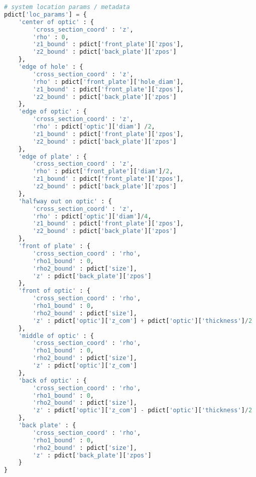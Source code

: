 \begin{spacing}{1.2}
\begin{lstlisting}[frame=single, language=Python]
# system location params / metadata
pdict['loc_params'] = {
    'center of optic' : {
        'cross_section_coord' : 'z',
        'rho' : 0,
        'z1_bound' : pdict['front_plate']['zpos'],
        'z2_bound' : pdict['back_plate']['zpos']
    },
    'edge of hole' : {
        'cross_section_coord' : 'z',
        'rho' : pdict['front_plate']['hole_diam'],
        'z1_bound' : pdict['front_plate']['zpos'],
        'z2_bound' : pdict['back_plate']['zpos']
    },
    'edge of optic' : {
        'cross_section_coord' : 'z',
        'rho' : pdict['optic']['diam'] /2,
        'z1_bound' : pdict['front_plate']['zpos'],
        'z2_bound' : pdict['back_plate']['zpos']
    },
    'edge of plate' : {
        'cross_section_coord' : 'z',
        'rho' : pdict['front_plate']['diam']/2,
        'z1_bound' : pdict['front_plate']['zpos'],
        'z2_bound' : pdict['back_plate']['zpos']
    },
    'halfway out on optic' : {
        'cross_section_coord' : 'z',
        'rho' : pdict['optic']['diam']/4,
        'z1_bound' : pdict['front_plate']['zpos'],
        'z2_bound' : pdict['back_plate']['zpos']
    },
    'front of plate' : {
        'cross_section_coord' : 'rho',
        'rho1_bound' : 0,
        'rho2_bound' : pdict['size'],
        'z' : pdict['back_plate']['zpos']
    },
    'front of optic' : {
        'cross_section_coord' : 'rho',
        'rho1_bound' : 0,
        'rho2_bound' : pdict['size'],
        'z' : pdict['optic']['z_com'] + pdict['optic']['thickness']/2
    },
    'middle of optic' : {
        'cross_section_coord' : 'rho',
        'rho1_bound' : 0,
        'rho2_bound' : pdict['size'],
        'z' : pdict['optic']['z_com']
    },
    'back of optic' : {
        'cross_section_coord' : 'rho',
        'rho1_bound' : 0,
        'rho2_bound' : pdict['size'],
        'z' : pdict['optic']['z_com'] - pdict['optic']['thickness']/2
    },
    'back plate' : {
        'cross_section_coord' : 'rho',
        'rho1_bound' : 0,
        'rho2_bound' : pdict['size'],
        'z' : pdict['back_plate']['zpos']
    }
}
\end{lstlisting}
\end{spacing}
